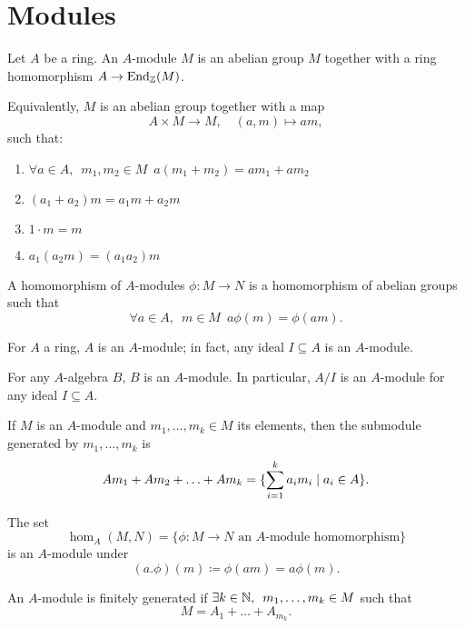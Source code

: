 \section{Modules}

\begin{df}
  Let $A$ be a ring. An $A$-module $M$ is an abelian group $M$ together with a ring homomorphism $A \to \operatorname*{End}_{\mathbb Z}(M)$.

Equivalently, $M$ is an abelian group together with a map
\[ A \times M \to M, \quad (a, m) \mapsto am, \]
such that:
\begin{enumerate}
\item $\forall a \in A, \enspace m_1, m_2 \in M \enspace a(m_1+m_2) = am_1 + am_2$
\item $(a_1 + a_2)m = a_1 m + a_2 m$
\item $1 \cdot m = m$
\item $a_1 (a_2 m) = (a_1 a_2) m$
\end{enumerate}
\end{df}

\begin{df}
  A homomorphism of $A$-modules $\phi \colon M \to N$ is a homomorphism of abelian groups such that
  \[ \forall a \in A, \enspace m \in M \enspace a \phi(m) = \phi(am). \]
\end{df}

\begin{example}
  For $A$ a ring, $A$ is an $A$-module; in fact, any ideal $I \subseteq A$ is an $A$-module.
\end{example}

\begin{example}
  For any $A$-algebra $B$, $B$ is an $A$-module. In particular, $A/{I}$ is an $A$-module for any ideal $I \subseteq A$.
\end{example}

\begin{df}
  If $M$ is an $A$-module and $m_1, \ldots, m_k \in M$ its elements, then the submodule generated by $m_1, \ldots, m_k$ is
  \[ Am_1 + Am_2 + \ldots + Am_k = \{ \sum_{i=1}^k a_i m_i \mathrel{|} a_i \in A \}.\]
\end{df}

\begin{note}
  The set
  \[ \hom_A(M, N) = \{ \phi: M \to N \text{ an $A$-module homomorphism} \} \]
  is an $A$-module under
  \[ (a.\phi)(m) \coloneqq \phi(am) = a \phi(m).\]
\end{note}

\begin{df}
  An $A$-module is finitely generated if
  $\exists k \in \mathbb N, \enspace m_1, \ldots, m_k \in M$
  such that
  \[M = A_1 + \ldots + A_{m_k}.\]
\end{df}

